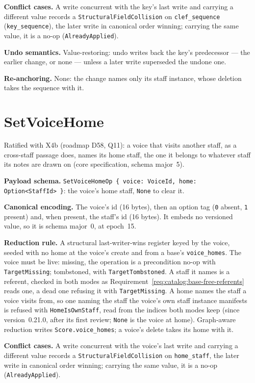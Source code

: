 \documentclass[11pt,letterpaper]{report}
\begin{document}
\textbf{Conflict cases.} A write concurrent with the key's last write and
carrying a different value records a \texttt{StructuralFieldCollision} on
\texttt{clef\_sequence} (\texttt{key\_sequence}), the later write in
canonical order winning; carrying the same value, it is a no-op
(\texttt{AlreadyApplied}).

\textbf{Undo semantics.} Value-restoring: undo writes back the key's
predecessor --- the earlier change, or none --- unless a later write
superseded the undone one.

\textbf{Re-anchoring.} None: the change names only its staff instance, whose
deletion takes the sequence with it.

\section{SetVoiceHome}
\label{sec:k0:set-voice-home}

Ratified with X4b (roadmap D58, Q11): a voice that visits another staff, as
a cross-staff passage does, names its home staff, the one it belongs to
whatever staff its notes are drawn on (core specification, schema major~5).

\textbf{Payload schema.} \texttt{SetVoiceHomeOp \{ voice: VoiceId, home:
Option<StaffId> \}}: the voice's home staff, \texttt{None} to clear it.

\textbf{Canonical encoding.} The voice's id (16 bytes), then an option tag
(\texttt{0} absent, \texttt{1} present) and, when present, the staff's id (16
bytes). It embeds no versioned value, so it is schema major~0, at epoch~15.

\textbf{Reduction rule.} A structural last-writer-wins register keyed by the
voice, seeded with no home at the voice's create and from a base's
\texttt{voice\_homes}. The voice must be live: missing, the operation is a
precondition no-op with \texttt{TargetMissing}; tombstoned, with
\texttt{TargetTombstoned}. A staff it names is a referent, checked in both
modes as Requirement~\ref{req:catalog:base-free-referents} reads one, a dead
one refusing it with \texttt{TargetMissing}. A home names the staff a voice
visits from, so one naming the staff the voice's own staff instance
manifests is refused with \texttt{HomeIsOwnStaff}, read from the indices both
modes keep (since version~0.21.0, after its first review; \texttt{None} is
the voice at home). Graph-aware reduction writes
\texttt{Score.voice\_homes}; a voice's delete takes its home with it.

\textbf{Conflict cases.} A write concurrent with the voice's last write and
carrying a different value records a \texttt{StructuralFieldCollision} on
\texttt{home\_staff}, the later write in canonical order winning; carrying the
same value, it is a no-op (\texttt{AlreadyApplied}).
\end{document}
